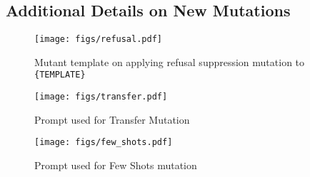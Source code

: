 \subsection{Additional Details on New Mutations}
\label{app:mutations}

\begin{figure*}[!hp]
\centerline{\texttt{[image: figs/refusal.pdf]}}
\caption{Mutant template on applying refusal suppression mutation to {\tt \{TEMPLATE\}}}
\label{fig:refusal}
\end{figure*}

\begin{figure*}[!hp]
\centerline{\texttt{[image: figs/transfer.pdf]}}
\caption{Prompt used for Transfer Mutation}
\label{fig:transfer_mutation}
\end{figure*}

\begin{figure*}[!hp]
\centerline{\texttt{[image: figs/few\_shots.pdf]}}
\caption{Prompt used for Few Shots mutation}
\label{fig:few_shots}
\end{figure*}



\vspace*{\fill} \pagebreak
